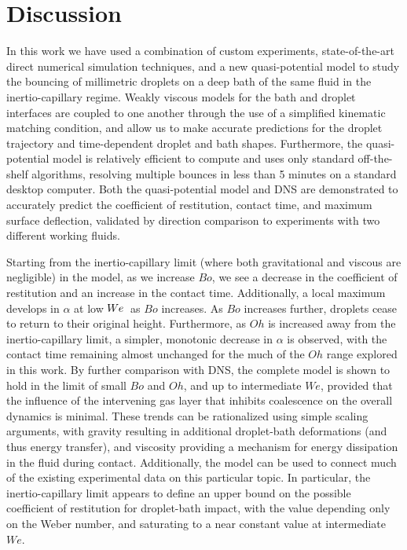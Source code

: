 \documentclass{jfm}
\begin{document}
\section{Discussion}
In this work we have used a combination of custom experiments, state-of-the-art direct numerical simulation techniques, and a new quasi-potential model to study the bouncing of millimetric droplets on a deep bath of the same fluid in the inertio-capillary regime. Weakly viscous models for the bath and droplet interfaces are coupled to one another through the use of a simplified kinematic matching condition, and allow us to make accurate predictions for the droplet trajectory and time-dependent droplet and bath shapes. Furthermore, the quasi-potential model is relatively efficient to compute and uses only standard off-the-shelf algorithms, resolving multiple bounces in less than 5 minutes on a standard desktop computer.  Both the quasi-potential model and DNS are demonstrated to accurately predict the coefficient of restitution, contact time, and maximum surface deflection, validated by direction comparison to experiments with two different working fluids. 

Starting from the inertio-capillary limit (where both gravitational and viscous are negligible) in the model, as we increase $Bo$, we see a decrease in the coefficient of restitution and an increase in the contact time. Additionally, a local maximum develops in $\alpha$ at low $W\kern-0.03em e\,$ as $Bo$ increases. As $Bo$ increases further, droplets cease to return to their original height. Furthermore, as $Oh$ is increased away from the inertio-capillary limit, a simpler, monotonic decrease in $\alpha$ is observed, with the contact time remaining almost unchanged for the much of the $Oh$ range explored in this work.  By further comparison with DNS, the complete model is shown to hold in the limit of small $Bo$ and $Oh$, and up to intermediate $We$, provided that the influence of the intervening gas layer that inhibits coalescence on the overall dynamics is minimal. These trends can be rationalized using simple scaling arguments, with gravity resulting in additional droplet-bath deformations (and thus energy transfer), and viscosity providing a mechanism for energy dissipation in the fluid during contact. Additionally, the model can be used to connect much of the existing experimental data on this particular topic.  In particular, the inertio-capillary limit appears to define an upper bound on the possible coefficient of restitution for droplet-bath impact, with the value depending only on the Weber number, and saturating to a near constant value at intermediate $We$.
\end{document}
